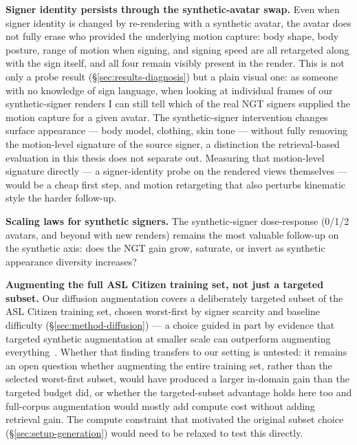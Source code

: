 \textbf{Signer identity persists through the synthetic-avatar swap.}
 Even
when signer identity is changed by re-rendering with a synthetic avatar,
the avatar does not fully erase who provided the underlying motion
capture: body shape, body posture, range of motion when signing, and
signing speed are all retargeted along with the sign itself, and all four
remain visibly present in the render. This is not only a probe result
(\S\ref{sec:results-diagnosis}) but a plain visual one: as someone with no
knowledge of sign language, when looking at individual frames of our
synthetic-signer renders I can still tell which of the real NGT signers
supplied the motion capture for a given avatar. The synthetic-signer
intervention changes surface appearance --- body model, clothing, skin
tone --- without fully removing the motion-level signature of the source
signer, a distinction the retrieval-based evaluation in this thesis does
not separate out. Measuring that motion-level signature directly --- a
signer-identity probe on the rendered views themselves --- would be a
cheap first step, and motion retargeting that also perturbs kinematic
style the harder follow-up.

\textbf{Scaling laws for synthetic signers.} The synthetic-signer
dose-response (0/1/2 avatars, and beyond with new renders) remains the
most valuable follow-up on the synthetic axis: does the NGT gain grow,
saturate, or invert as synthetic appearance diversity increases?

\textbf{Augmenting the full ASL Citizen training set, not just a targeted
subset.} Our diffusion augmentation covers a deliberately targeted subset
of the ASL Citizen training set, chosen worst-first by signer scarcity and
baseline difficulty (\S\ref{sec:method-diffusion}) --- a choice guided in
part by evidence that targeted synthetic augmentation at smaller scale can
outperform augmenting everything~\cite{nguyenDoWeNeedSynthetic2025}.
Whether that finding transfers to our setting is untested: it remains an
open question whether augmenting the entire training set, rather than the
selected worst-first subset, would have produced a larger in-domain gain
than the targeted budget did, or whether the targeted-subset advantage
holds here too and full-corpus augmentation would mostly add compute cost
without adding retrieval gain. The compute constraint that motivated the
original subset choice (\S\ref{sec:setup-generation}) would need to be
relaxed to test this directly.

